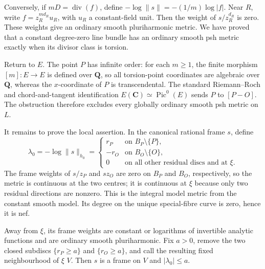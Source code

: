 Conversely, if \(mD=\operatorname{div}(f)\), define
\(-\log\|s\|=-(1/m)\log|f|\).  Near \(R\), write
\(f=z_R^{md_R}u_R\), with \(u_R\) a constant-field unit.  Then the weight
of \(s/z_R^{d_R}\) is zero.  These weights give an ordinary smooth
pluriharmonic metric.  We have proved that a constant degree-zero line
bundle has an ordinary smooth psh metric exactly when its divisor class is
torsion.

Return to \(E\).  The point \(P\) has infinite order: for each \(m\geq1\),
the finite morphism \([m]\colon E\to E\) is defined over \(\mathbf Q\), so
all torsion-point coordinates are algebraic over \(\mathbf Q\), whereas
the \(x\)-coordinate of \(P\) is transcendental.  The standard
Riemann--Roch and chord-and-tangent identification
\(E(\mathbf C)\simeq\operatorname{Pic}^0(E)\) sends \(P\) to \([P-O]\).
The obstruction therefore excludes every globally ordinary smooth psh
metric on \(L\).

It remains to prove the local assertion.  In the canonical rational frame
\(s\), define
\[
 \lambda_0=-\log\|s\|_{h_0}=
 \begin{cases}
  r_P&\text{on }B_P\setminus\{P\},\\
  -r_O&\text{on }B_O\setminus\{O\},\\
  0&\text{on all other residual discs and at }\xi.
 \end{cases}
\]
The frame weights of \(s/z_P\) and \(sz_O\) are zero on \(B_P\) and
\(B_O\), respectively, so the metric is continuous at the two centres; it
is continuous at \(\xi\) because only two residual directions are nonzero.
This is the integral model metric from the constant smooth model.  Its
degree on the unique special-fibre curve is zero, hence it is nef.

Away from \(\xi\), its frame weights are constant or logarithms of
invertible analytic functions and are ordinary smooth pluriharmonic.  Fix
\(a>0\), remove the two closed subdiscs \(\{r_P\geq a\}\) and
\(\{r_O\geq a\}\), and call the resulting fixed neighbourhood of \(\xi\)
\(V\).  Then \(s\) is a frame on \(V\) and \(|\lambda_0|\leq a\).

